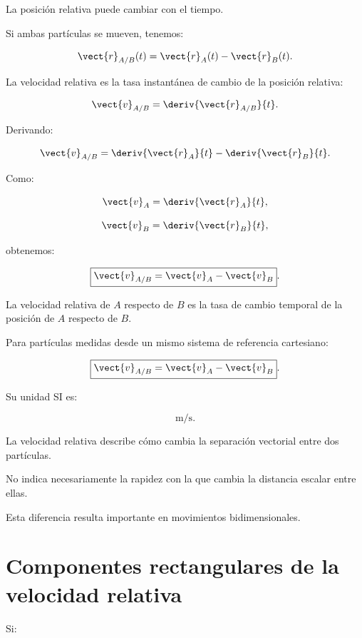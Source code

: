 La posición relativa puede cambiar con el tiempo.

Si ambas partículas se mueven, tenemos:

\[
\vect{r}_{A/B}(t)
=
\vect{r}_A(t)-\vect{r}_B(t).
\]

La velocidad relativa es la tasa instantánea de cambio
de la posición relativa:

\[
\vect{v}_{A/B}
=
\deriv{\vect{r}_{A/B}}{t}.
\]

Derivando:

\[
\vect{v}_{A/B}
=
\deriv{\vect{r}_A}{t}
-
\deriv{\vect{r}_B}{t}.
\]

Como:

\[
\vect{v}_A=\deriv{\vect{r}_A}{t},
\]

\[
\vect{v}_B=\deriv{\vect{r}_B}{t},
\]

obtenemos:

\[
\boxed{
\vect{v}_{A/B}
=
\vect{v}_A-\vect{v}_B
}.
\]

\begin{definicion}

La velocidad relativa de \(A\) respecto de \(B\) es
la tasa de cambio temporal de la posición de \(A\)
respecto de \(B\).

Para partículas medidas desde un mismo sistema de
referencia cartesiano:

\[
\boxed{
\vect{v}_{A/B}=\vect{v}_A-\vect{v}_B
}.
\]

\end{definicion}

Su unidad SI es:

\[
\si{\meter\per\second}.
\]

\begin{interpretacion}

La velocidad relativa describe cómo cambia la separación
vectorial entre dos partículas.

No indica necesariamente la rapidez con la que cambia
la distancia escalar entre ellas.

Esta diferencia resulta importante en movimientos
bidimensionales.

\end{interpretacion}


\section{Componentes rectangulares de la velocidad relativa}

Si:


